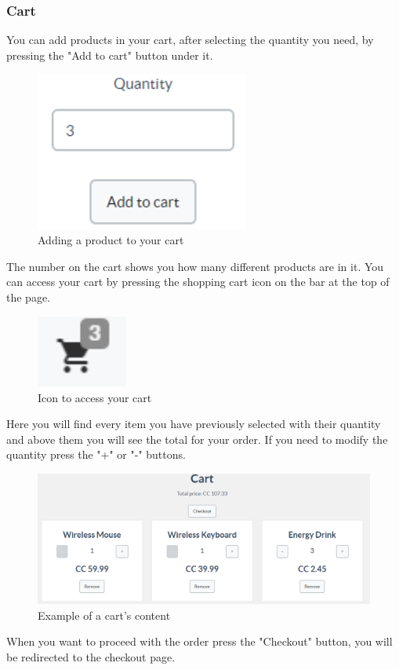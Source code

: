 		\subsubsection{Cart}
		You can add products in your cart, after selecting the quantity you need, 
		by pressing the "Add to cart" button under it.
	\begin{figure}[H]
		\includegraphics[width=7cm]{res/images/add_to_cart.png}
		\centering
		\caption{Adding a product to your cart}
	\end{figure}
	\noindent The number on the cart shows you how many different products are 
	in it. You can access your cart by pressing the shopping cart icon on 
	the bar at the top of the page.
	\begin{figure}[H]
		\includegraphics[width=3cm]{res/images/cart_icon.png}
		\centering
		\caption{Icon to access your cart}
	\end{figure}
	\noindent Here you will find every item you have previously selected with 
	their quantity and above them you will see the total for your order.
	If you need to modify the quantity press the "+" or "-" buttons. \\
	\begin{figure}[H]
		\includegraphics[width=15cm]{res/images/cart_example.png}
		\centering
		\caption{Example of a cart's content}
	\end{figure}
	\noindent When you want to proceed with the order press the "Checkout" button, 
	you will be redirected to the checkout page.
